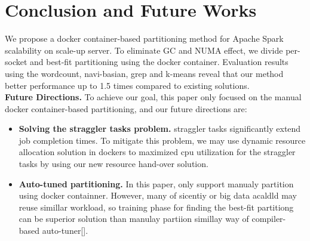 \section{Conclusion and Future Works}

\ifkor
We propose a docker container-based partitioning method for Apache
Spark scalability on scale-up server.
To eliminate GC and NUMA effect, we divide per-socket and best-fit partitioning
using the docker container.
Evaluation results using the wordcount, navi-basian, grep and k-means reveal
that our method better performance up to 1.5 times compared to existing
solutions.
\newline\\
\noindent
\textbf{Future Directions.} 
To achieve our goal, this paper only focused on the manual docker
container-based partitioning, and our future directions are:
\begin{itemize}
\item \textbf{Solving the straggler tasks problem.} straggler tasks
significantly extend job completion times.
To mitigate this problem, we may use dynamic resource allocation solution in
dockers to maximized cpu utilization for the straggler tasks by using our new
resource hand-over solution.
\item \textbf{Auto-tuned partitioning.} In this paper, only support manualy
partition using docker containner. However, many of sicentiy or big data acaldld
may reuse simillar workload, so training phase for finding the best-fit
partitiong can be superior solution than manulay partiion simillay way of
compiler-based auto-tuner[].

\end{itemize}

\else

\fi
